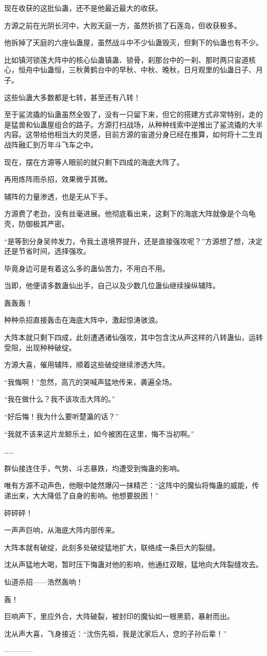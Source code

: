 \begin{this_body}
现在收获的这批仙蛊，还不是他最近最大的收获。

方源之前在光阴长河中，大败天庭一方，虽然折损了石莲岛，但收获极多。

他拆掉了天庭的六座仙蛊屋，虽然战斗中不少仙蛊毁灭，但剩下的仙蛊也有不少。

比如镇河锁莲大阵中的核心仙蛊镇蛊、锁骨，刹那台中的一刹、那时两只宙道核心，恒舟中仙蛊恒，三秋黄鹤台中的早秋、中秋、晚秋，日月观里的仙蛊日子、月子。

这些仙蛊大多数都是七转，甚至还有八转！

至于鲨流撬的仙蛊虽然全毁了，没有一只留下来，但它的搭建方式非常特别，走的是猛兽和仙蛊屋组合的路子。方源打扫战场，从种种线索中逆推出了鲨流撬的大半内容。这带给他相当大的灵感，目前方源的宙道分身已经在推算，如何将十二生肖战阵融汇到万年斗飞车之中。

现在，摆在方源等人眼前的就只剩下四成的海底大阵了。

再用炼阵雨杀招，效果微乎其微。

辅阵的力量渗透，也是无从下手。

方源费了老劲，没有丝毫进展。他彻底看出来，这剩下的海底大阵就像是个乌龟壳，防御极其严密。

“是等到分身吴帅发力，令我土道境界提升，还是直接强攻呢？”方源想了想，决定还是节省时间，选择强攻。

毕竟身边可是有着这么多的蛊仙苦力，不用白不用。

当即，他便请多数蛊仙出手，自己以及少数几位蛊仙继续操纵辅阵。

轰轰轰！

种种杀招直接轰击在海底大阵中，激起惊涛骇浪。

大阵本就只剩下四成，此刻遭遇诸仙强攻，其中包含沈从声这样的八转蛊仙，运转受阻，出现种种破绽。

方源大喜，催用辅阵，顺着这些破绽继续渗透大阵。

“我悔啊！”忽然，高亢的哭喊声猛地传来，袭遍全场。

“我在做什么？我不该攻击大阵的。”

“好后悔！我为什么要听楚瀛的话？”

“我就不该来这片龙鲸乐土，如今被困在这里，悔不当初啊。”

……

群仙接连住手，气势、斗志暴跌，均遭受到悔蛊的影响。

唯有方源不动声色，他眼中陡然爆闪一抹精芒：“这阵中的魔仙将悔蛊的威能，传递出来，大大降低了自身的影响。他想要脱困！”

砰砰砰！

一声声巨响，从海底大阵内部传来。

大阵本就有破绽，此刻多处破绽猛地扩大，联络成一条巨大的裂缝。

沈从声猛地大喝，暂时压下悔蛊对他的影响，他通红双眼，猛地向大阵裂缝攻去。

仙道杀招——浩然轰响！

轰！

巨响声下，里应外合，大阵破裂，被封印的魔仙如一根黑箭，暴射而出。

沈从声大喜，飞身接近：“沈伤先祖，我是沈家后人，您的子孙后辈！”

------------

\end{this_body}

